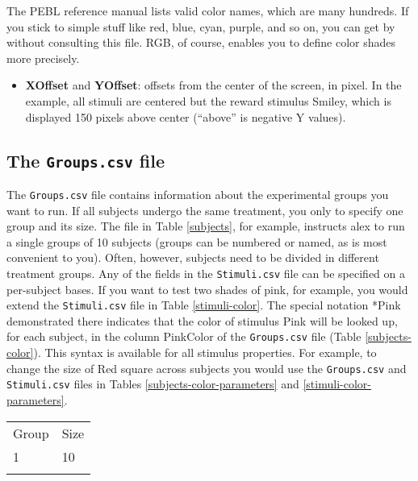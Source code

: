 \documentclass[11pt,]{article}
\renewcommand{\medskip}{}
\begin{document}
The PEBL reference manual lists valid color names, which are many
hundreds. If you stick to simple stuff like red, blue, cyan, purple, and
so on, you can get by without consulting this file. RGB, of course,
enables you to define color shades more precisely.

\begin{itemize}
\itemsep1pt\parskip0pt
\item
  \textbf{XOffset} and \textbf{YOffset}: offsets from the center of the
  screen, in pixel. In the example, all stimuli are centered but the
  reward stimulus Smiley, which is displayed 150 pixels above center
  (``above'' is negative Y values).
\end{itemize}

\subsection{The \texttt{Groups.csv} file}

The \texttt{Groups.csv} file contains information about the experimental
groups you want to run. If all subjects undergo the same treatment, you
only to specify one group and its size. The file in Table
\ref{subjects}, for example, instructs alex to run a single groups of 10
subjects (groups can be numbered or named, as is most convenient to
you). Often, however, subjects need to be divided in different treatment
groups. Any of the fields in the \texttt{Stimuli.csv} file can be
specified on a per-subject bases. If you want to test two shades of
pink, for example, you would extend the \texttt{Stimuli.csv} file in
Table \ref{stimuli-color}. The special notation *Pink demonstrated there
indicates that the color of stimulus Pink will be looked up, for each
subject, in the column PinkColor of the \texttt{Groups.csv} file (Table
\ref{subjects-color}). This syntax is available for all stimulus
properties. For example, to change the size of Red square across
subjects you would use the \texttt{Groups.csv} and \texttt{Stimuli.csv}
files in Tables \ref{subjects-color-parameters} and
\ref{stimuli-color-parameters}.

\begin{table*}[t]\begin{center}\small\begin{tabular}{@{}ll@{}}
\hline\noalign{\medskip}
Group & Size
\\\noalign{\medskip}
\hline\noalign{\medskip}
1 & 10
\\\noalign{\medskip}
\hline
\noalign{\medskip}
\end{tabular}\caption{A \texttt{Groups.csv} file instructing alex to run 6 subjects.
\label{subjects}}
\end{center}\end{table*}
\end{document}
